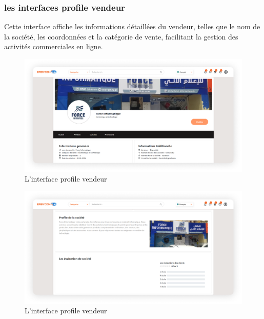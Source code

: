 \documentclass[edit,12pt,a4paper,ChapStyle,oneside,doubleinterligne]{report}
\begin{document}
\subsubsection{les interfaces profile vendeur}
Cette interface affiche les informations détaillées du vendeur, telles que le nom de la société, les coordonnées et la catégorie de vente, facilitant la gestion des activités commerciales en ligne.
  \begin{figure} [H]
    \centering
    \includegraphics[width=1\textwidth]{images/profil vendeur.png}
    \caption{L'interface profile vendeur}
    \label{fig:profil vendeur}
\end{figure}
\begin{figure} [H]
    \centering
    \includegraphics[width=1\textwidth]{images/profil vendeur 1.png}
    \caption{L'interface profile vendeur}
    \label{fig:profil vendeur}
\end{figure}
\end{document}
